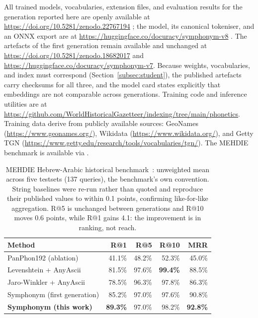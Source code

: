 \documentclass[11pt,a4paper]{article}
\begin{document}
All trained models, vocabularies, extension files, and evaluation results for the generation reported here are openly available at \url{https://doi.org/10.5281/zenodo.22767194} \citep{symphonym2026zenodo}; the model, its canonical tokeniser, and an ONNX export are at \url{https://huggingface.co/docuracy/symphonym-v8} \citep{symphonym2026hf}. The artefacts of the first generation remain available and unchanged at \url{https://doi.org/10.5281/zenodo.18682017} and \url{https://huggingface.co/docuracy/symphonym-v7}. Because weights, vocabularies, and index must correspond (Section~\ref{subsec:student}), the published artefacts carry checksums for all three, and the model card states explicitly that embeddings are not comparable across generations. Training code and inference utilities are at \url{https://github.com/WorldHistoricalGazetteer/indexing/tree/main/phonetics}. Training data derive from publicly available sources: GeoNames (\url{https://www.geonames.org/}), Wikidata (\url{https://www.wikidata.org/}), and Getty TGN (\url{https://www.getty.edu/research/tools/vocabularies/tgn/}). The MEHDIE benchmark is available via \citet{mehdie2025}.








\clearpage

\begin{table}[p]
\centering
\small
\begin{tabular}{lrrrr}
\toprule
\textbf{Method} & \textbf{R@1} & \textbf{R@5} & \textbf{R@10} & \textbf{MRR} \\
\midrule
PanPhon192 (ablation)      & 41.1\% & 48.2\% & 52.3\% & 45.0\% \\
Levenshtein + AnyAscii     & 81.5\% & 97.6\% & \textbf{99.4\%} & 88.5\% \\
Jaro-Winkler + AnyAscii    & 78.5\% & 96.3\% & 97.8\% & 86.3\% \\
Symphonym (first generation) & 85.2\% & 97.0\% & 97.6\% & 90.8\% \\
\textbf{Symphonym (this work)} & \textbf{89.3\%} & 97.0\% & 98.2\% & \textbf{92.8\%} \\
\bottomrule
\end{tabular}
\caption{MEHDIE Hebrew-Arabic historical benchmark~\citep{mehdie2025}: unweighted mean across five testsets (137 queries), the benchmark's own convention. String baselines were re-run rather than quoted and reproduce their published values to within 0.1 points, confirming like-for-like aggregation. R@5 is unchanged between generations and R@10 moves 0.6 points, while R@1 gains 4.1: the improvement is in ranking, not reach.}
\label{tab:mehdie-ranking}
\end{table}
\end{document}
